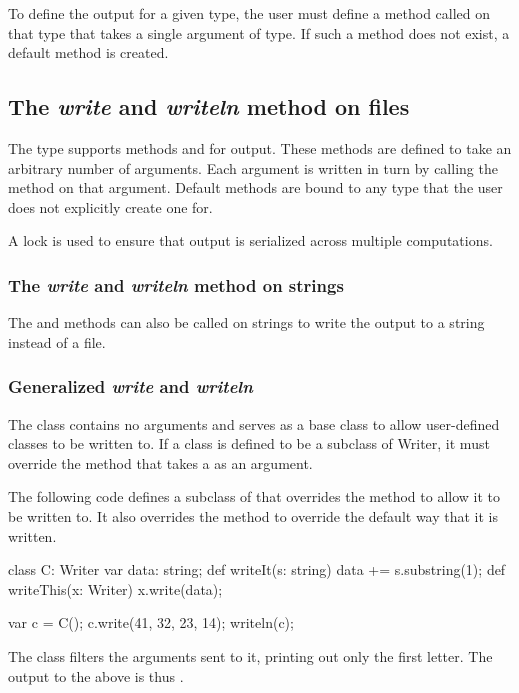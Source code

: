 To define the output for a given type, the user must define a method
called  on that type that takes a single argument of
 type.  If such a method does not exist, a default method is
created.

\subsection{The {\em write} and {\em writeln} method on files}
\label{filewrite}

The  type supports methods  and 
for output.  These methods are defined to take an arbitrary number of
arguments.  Each argument is written in turn by calling
the  method on that argument.
Default  methods are bound to any type that the user
does not explicitly create one for.

A lock is used to ensure that output is serialized across multiple
computations.

\subsubsection{The {\em write} and {\em writeln} method on strings}
\label{stringwrite}

The  and  methods can also be called on
strings to write the output to a string instead of a file.

\subsubsection{Generalized {\em write} and {\em writeln}}
\label{writer}

The  class contains no arguments and serves as a base
class to allow user-defined classes to be written to.  If a class is
defined to be a subclass of Writer, it must override
the  method that takes a  as an argument.

\begin{example}
The following code defines a subclass of  that overrides
the  method to allow it to be written to.  It also
overrides the  method to override the default way that
it is written.
\begin{chapel}
class C: Writer {
  var data: string;
  def writeIt(s: string) {
    data += s.substring(1);
  }
  def writeThis(x: Writer) {
    x.write(data);
  }
}

var c = C();
c.write(41, 32, 23, 14);
writeln(c);
\end{chapel}
The  class filters the arguments sent to it, printing out only
the first letter.  The output to the above is thus .
\end{example}



